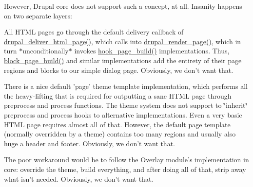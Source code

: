 However, Drupal core does not support such a concept, at all. Insanity happens on two separate layers:
\begin{DoxyItemize}
\item All HTML pages go through the default delivery callback of \hyperlink{common_8inc_a05ab0d6e81d6cbe2a6b9f645b9e710ec}{drupal\_\-deliver\_\-html\_\-page()}, which calls into \hyperlink{common_8inc_ad85d021b660f070849ed7c215d9758fe}{drupal\_\-render\_\-page()}, which in turn $\ast$unconditionally$\ast$ invokes \hyperlink{group__hooks_ga16d8d8ae818dc759bbe539e16ff5b93b}{hook\_\-page\_\-build()} implementations. Thus, \hyperlink{block_8module_a554cfaeffe083326bc06d1c59fba4f3d}{block\_\-page\_\-build()} and similar implementations add the entirety of their page regions and blocks to our simple dialog page. Obviously, we don't want that.
\item There is a nice default 'page' theme template implementation, which performs all the heavy-\/lifting that is required for outputting a sane HTML page through preprocess and process functions. The theme system does not support to \char`\"{}inherit\char`\"{} preprocess and process hooks to alternative implementations. Even a very basic HTML page requires almost all of that. However, the default page template (normally overridden by a theme) contains too many regions and usually also huge a header and footer. Obviously, we don't want that.
\end{DoxyItemize}

The poor workaround would be to follow the Overlay module's implementation in core: override the theme, build everything, and after doing all of that, strip away what isn't needed. Obviously, we don't want that.

